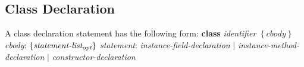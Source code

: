 \begin{homeworkProblem}
    \subsection{Class Declaration}
    A class declaration statement has the following form:
    \newline
    \textbf{class} \textit{identifier} $\left\{ \textit{cbody} \right\}$
    \newline
    \textit{cbody}: $\left\{ \textit{statement-list\textsubscript{opt}} \right\}$
    \newline
    \textit{statement}: \textit{instance-field-declaration} $|$ \textit{instance-method-declaration} $|$ \textit{constructor-declaration}
	
\end{homeworkProblem}
